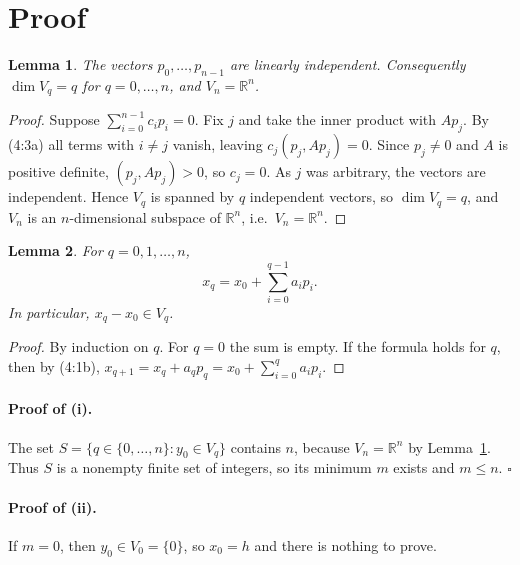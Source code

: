 \documentclass[11pt]{article}
\newtheorem{lemma}{Lemma}
\begin{document}
\section*{Proof}

\begin{lemma}\label{lem:indep}
The vectors $p_0, \dots, p_{n-1}$ are linearly independent. Consequently
$\dim V_q = q$ for $q = 0, \dots, n$, and $V_n = \mathbb{R}^n$.
\end{lemma}

\begin{proof}
Suppose $\sum_{i=0}^{n-1} c_i p_i = 0$. Fix $j$ and take the inner product with $Ap_j$.
By (4:3a) all terms with $i \neq j$ vanish, leaving $c_j (p_j, Ap_j) = 0$.
Since $p_j \neq 0$ and $A$ is positive definite, $(p_j, Ap_j) > 0$, so $c_j = 0$.
As $j$ was arbitrary, the vectors are independent. Hence $V_q$ is spanned by $q$
independent vectors, so $\dim V_q = q$, and $V_n$ is an $n$-dimensional subspace of
$\mathbb{R}^n$, i.e.\ $V_n = \mathbb{R}^n$.
\end{proof}

\begin{lemma}\label{lem:iterate}
For $q = 0, 1, \dots, n$,
\[
x_q = x_0 + \sum_{i=0}^{q-1} a_i p_i .
\]
In particular, $x_q - x_0 \in V_q$.
\end{lemma}

\begin{proof}
By induction on $q$. For $q = 0$ the sum is empty. If the formula holds for $q$, then
by (4:1b), $x_{q+1} = x_q + a_q p_q = x_0 + \sum_{i=0}^{q} a_i p_i$.
\end{proof}

\paragraph{Proof of (i).}
The set $S = \{ q \in \{0, \dots, n\} : y_0 \in V_q \}$ contains $n$, because
$V_n = \mathbb{R}^n$ by Lemma~\ref{lem:indep}. Thus $S$ is a nonempty finite set of
integers, so its minimum $m$ exists and $m \le n$. \hfill$\square$

\paragraph{Proof of (ii).}
If $m = 0$, then $y_0 \in V_0 = \{0\}$, so $x_0 = h$ and there is nothing to prove.
\end{document}
